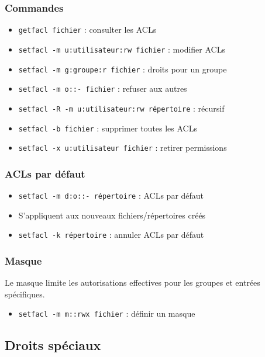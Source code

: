 \documentclass[12pt,a4paper]{article}
\begin{document}
\subsubsection{Commandes}
\begin{itemize}
    \item \texttt{getfacl fichier} : consulter les ACLs
    \item \texttt{setfacl -m u:utilisateur:rw fichier} : modifier ACLs
    \item \texttt{setfacl -m g:groupe:r fichier} : droits pour un groupe
    \item \texttt{setfacl -m o::- fichier} : refuser aux autres
    \item \texttt{setfacl -R -m u:utilisateur:rw r\'epertoire} : r\'ecursif
    \item \texttt{setfacl -b fichier} : supprimer toutes les ACLs
    \item \texttt{setfacl -x u:utilisateur fichier} : retirer permissions
\end{itemize}

\subsubsection{ACLs par d\'efaut}
\begin{itemize}
    \item \texttt{setfacl -m d:o::- r\'epertoire} : ACLs par d\'efaut
    \item S'appliquent aux nouveaux fichiers/r\'epertoires cr\'e\'es
    \item \texttt{setfacl -k r\'epertoire} : annuler ACLs par d\'efaut
\end{itemize}

\subsubsection{Masque}
Le masque limite les autorisations effectives pour les groupes et entr\'ees sp\'ecifiques.
\begin{itemize}
    \item \texttt{setfacl -m m::rwx fichier} : d\'efinir un masque
\end{itemize}

\subsection{Droits sp\'eciaux}

\end{document}
